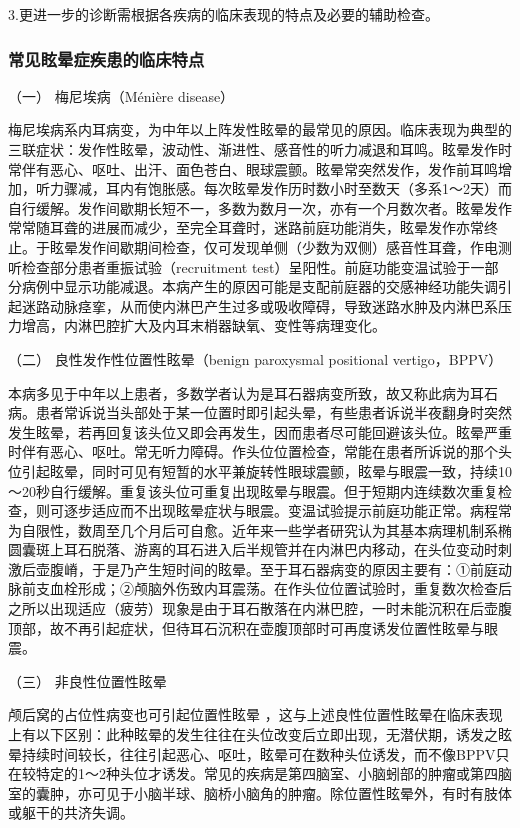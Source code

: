 3.更进一步的诊断需根据各疾病的临床表现的特点及必要的辅助检查。

\subsubsection{常见眩晕症疾患的临床特点}

\hypertarget{text00012.htmlux5cux23CHP1-3-2-6-1}{}
（一） 梅尼埃病（Ménière disease）

梅尼埃病系内耳病变，为中年以上阵发性眩晕的最常见的原因。临床表现为典型的三联症状：发作性眩晕，波动性、渐进性、感音性的听力减退和耳鸣。眩晕发作时常伴有恶心、呕吐、出汗、面色苍白、眼球震颤。眩晕常突然发作，发作前耳鸣增加，听力骤减，耳内有饱胀感。每次眩晕发作历时数小时至数天（多系1～2天）而自行缓解。发作间歇期长短不一，多数为数月一次，亦有一个月数次者。眩晕发作常常随耳聋的进展而减少，至完全耳聋时，迷路前庭功能消失，眩晕发作亦常终止。于眩晕发作间歇期间检查，仅可发现单侧（少数为双侧）感音性耳聋，作电测听检查部分患者重振试验（recruitment
test）呈阳性。前庭功能变温试验于一部分病例中显示功能减退。本病产生的原因可能是支配前庭器的交感神经功能失调引起迷路动脉痉挛，从而使内淋巴产生过多或吸收障碍，导致迷路水肿及内淋巴系压力增高，内淋巴腔扩大及内耳末梢器缺氧、变性等病理变化。

\hypertarget{text00012.htmlux5cux23CHP1-3-2-6-2}{}
（二） 良性发作性位置性眩晕（benign paroxysmal positional
vertigo，BPPV）

本病多见于中年以上患者，多数学者认为是耳石器病变所致，故又称此病为耳石病。患者常诉说当头部处于某一位置时即引起头晕，有些患者诉说半夜翻身时突然发生眩晕，若再回复该头位又即会再发生，因而患者尽可能回避该头位。眩晕严重时伴有恶心、呕吐。常无听力障碍。作头位位置检查，常能在患者所诉说的那个头位引起眩晕，同时可见有短暂的水平兼旋转性眼球震颤，眩晕与眼震一致，持续10～20秒自行缓解。重复该头位可重复出现眩晕与眼震。但于短期内连续数次重复检查，则可逐步适应而不出现眩晕症状与眼震。变温试验提示前庭功能正常。病程常为自限性，数周至几个月后可自愈。近年来一些学者研究认为其基本病理机制系椭圆囊斑上耳石脱落、游离的耳石进入后半规管并在内淋巴内移动，在头位变动时刺激后壶腹嵴，于是乃产生短时间的眩晕。至于耳石器病变的原因主要有：①前庭动脉前支血栓形成；②颅脑外伤致内耳震荡。在作头位位置试验时，重复数次检查后之所以出现适应（疲劳）现象是由于耳石散落在内淋巴腔，一时未能沉积在后壶腹顶部，故不再引起症状，但待耳石沉积在壶腹顶部时可再度诱发位置性眩晕与眼震。

\hypertarget{text00012.htmlux5cux23CHP1-3-2-6-3}{}
（三） 非良性位置性眩晕

颅后窝的占位性病变也可引起位置性眩晕
，这与上述良性位置性眩晕在临床表现上有以下区别：此种眩晕的发生往往在头位改变后立即出现，无潜伏期，诱发之眩晕持续时间较长，往往引起恶心、呕吐，眩晕可在数种头位诱发，而不像BPPV只在较特定的1～2种头位才诱发。常见的疾病是第四脑室、小脑蚓部的肿瘤或第四脑室的囊肿，亦可见于小脑半球、脑桥小脑角的肿瘤。除位置性眩晕外，有时有肢体或躯干的共济失调。

